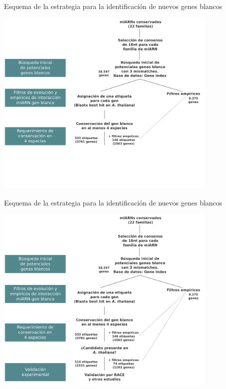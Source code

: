 \documentclass{beamer}
\begin{document}
\begin{frame}{Esquema de la estrategia para la identificación de nuevos genes blancos}
	\begin{center}
		\includegraphics[width=0.8\textwidth]{img/NAR_fig01_03.png}
	\end{center}
\end{frame}


\begin{frame}{Esquema de la estrategia para la identificación de nuevos genes blancos}
	\begin{center}
		\includegraphics[width=0.8\textwidth]{img/NAR_fig01_04.png}
	\end{center}
\end{frame}
\end{document}
